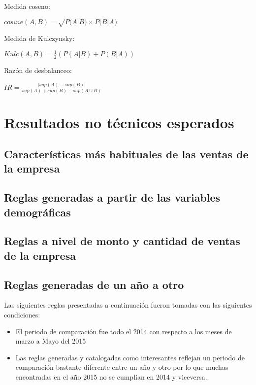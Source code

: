 \documentclass[]{article}
\begin{document}
Medida coseno:

\begin{center}
	$cosine(A,B) = \sqrt{P(A|B) \times P(B|A})$
\end{center}
	
Medida de Kulczynsky:
	
	\begin{center}
	$Kulc(A,B)= \frac{1}{2}\left(P(A|B) + P(B|A)\right)$	
\end{center}
		
Razón de desbalanceo:
		
\begin{center}
	$IR = \frac{|sup(A)- sup(B)|}{sup(A)+ sup(B)-sup(A \cup B)}$	
\end{center}

\section{Resultados no técnicos esperados}


\subsection{Características más habituales de las ventas de la empresa}


\subsection{Reglas generadas a partir de las variables demográficas}

\subsection{Reglas a nivel de monto y cantidad de ventas de la empresa}

\subsection{Reglas generadas de un año a otro}
Las siguientes reglas presentadas a continuación fueron tomadas con las siguientes condiciones:\\
\begin{itemize}
	\item El periodo de comparación fue todo el 2014 con respecto a los meses de marzo a Mayo del 2015\\
	\item Las reglas generadas y catalogadas como interesantes reflejan un periodo de comparación bastante diferente entre un año y otro por lo que muchas encontradas en el año 2015 no se cumplían en 2014 y viceversa.\\
\end{itemize}
\end{document}
